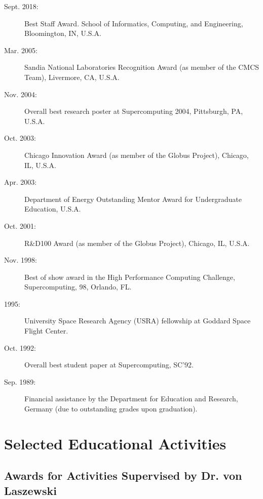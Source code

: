 \documentclass{article}
\begin{document}
\begin{description}
\item[Sept. 2018:]  	Best Staff Award. School of Informatics, Computing, and Engineering, 
Bloomington, IN, U.S.A. 

\item[Mar. 2005:]  	Sandia National Laboratories Recognition Award (as member of the CMCS   
  		Team), Livermore, CA, U.S.A. 

\item[Nov. 2004:]  	Overall best research poster at Supercomputing 2004, Pittsburgh, PA, U.S.A. 

\item[Oct. 2003:]  	Chicago Innovation Award (as member of the Globus Project), Chicago, IL, U.S.A. 

\item[Apr. 2003:] 	Department of Energy Outstanding Mentor Award for Undergraduate Education, U.S.A. 

\item[Oct. 2001:] 	R\&D100 Award (as member of the Globus Project), Chicago, IL, U.S.A. 

\item[Nov. 1998:] 	Best of show award in the High Performance Computing Challenge, 
  		Supercomputing‚ 98, Orlando, FL. 

\item[1995:]  	University Space Research Agency (USRA) fellowship at Goddard Space Flight Center. 

\item[Oct. 1992:] 	Overall best student paper at Supercomputing‚ SC’92. 

\item[Sep. 1989:] 	Financial assistance by the Department for Education and Research, Germany  
(due to outstanding grades upon graduation).
\end{description}

\section{Selected Educational Activities} 
 
\subsection{Awards for Activities Supervised by Dr. von Laszewski}
\end{document}
